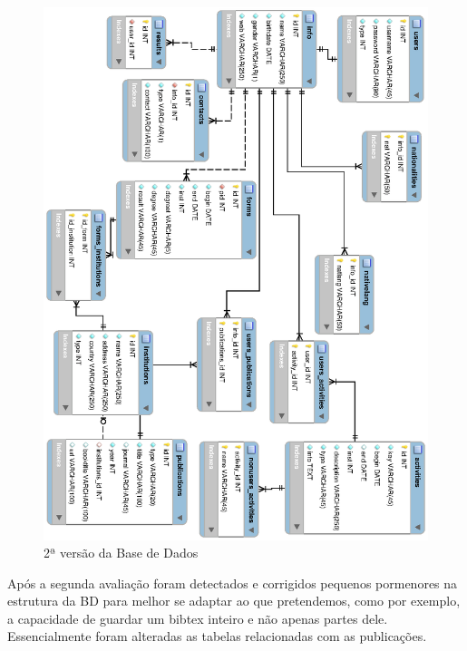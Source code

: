 \documentclass[a4paper,11pt,openright,openbib]{article}
\begin{document}
\begin{figure}[!ht]
\centering
\includegraphics[scale=1]{bd2.eps}
\caption{2ª versão da Base de Dados}
\label{fig:basededados2}
\end{figure}
Após a segunda avaliação foram detectados e corrigidos pequenos pormenores na estrutura da BD para melhor se adaptar ao que pretendemos, como por exemplo, a capacidade de guardar um bibtex inteiro e não apenas partes dele. Essencialmente foram alteradas as tabelas relacionadas com as publicações.
\end{document}
